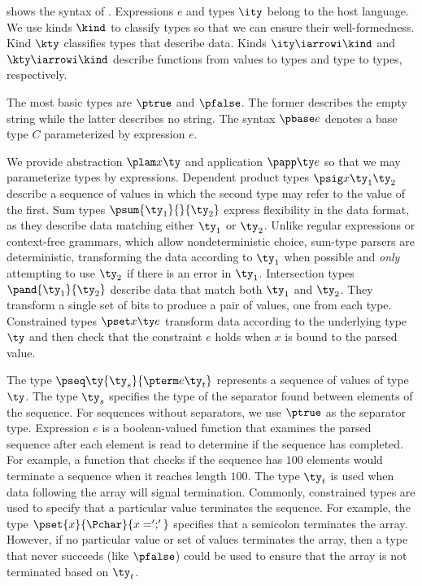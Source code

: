  shows the syntax of \ddc{}. Expressions $e$
and types $\ity$ belong to the host language.  
We use kinds $\kind$ to classify types so that we can ensure their
well-formedness. Kind $\kty$ classifies types that describe data.
Kinds $\ity \iarrowi \kind$ and $\kty \iarrowi \kind$ describe
functions from values to types and type to types, respectively.

The most basic types are $\ptrue$ and $\pfalse$. The former describes
the empty string while the latter describes no string.
The syntax $\pbase e$ denotes a base type $C$ parameterized by 
expression $e$.

We provide abstraction $\plam x {} \ty$ and application
$\papp \ty e$ so that we may parameterize types by expressions.
Dependent product types $\psig x {\ty_1} {\ty_2}$ describe a sequence
of values in which the second type may refer to the value of the first.
Sum types $\psum {\ty_1} {} {\ty_2}$
express flexibility in the data format, as they describe
data matching either $\ty_1$ or $\ty_2$. Unlike regular expressions or
context-free grammars, which allow nondeterministic choice,
sum-type parsers
are deterministic, transforming the data according to $\ty_1$
when possible and {\it only} attempting to
use $\ty_2$ if there is an error in $\ty_1$. Intersection types
$\pand {\ty_1} {\ty_2}$ describe data that match both $\ty_1$ and
$\ty_2$. They transform a single set of bits to produce
a pair of values, one from each type. Constrained types $\pset x \ty e$
transform data according to the underlying type $\ty$ and
then check that the constraint $e$ holds when $x$ is bound to the parsed value.

The type $\pseq \ty {\ty_s} {\pterm e {\ty_t}}$ represents a sequence
of values of type $\ty$. The type $\ty_s$ specifies the type of the
separator found between elements of the sequence. For sequences
without separators, we use $\ptrue$ as the separator type.  Expression
$e$ is a boolean-valued function that examines the parsed sequence
after each element is read to determine if the sequence has completed.
For example, a function that checks if the sequence has $100$ elements
would terminate a sequence when it reaches length $100$.  The type
$\ty_t$ is used when data following the array will signal termination.
Commonly, constrained types are used to specify that a particular
value terminates the sequence.  For example, the type
$\pset{x}{\Pchar}{x = ';'}$ specifies that a semicolon terminates the
array. However, if no particular value or set of values terminates the
array, then a type that never succeeds (like $\pfalse$) could be used
to ensure that the array is not terminated based on $\ty_t$.


